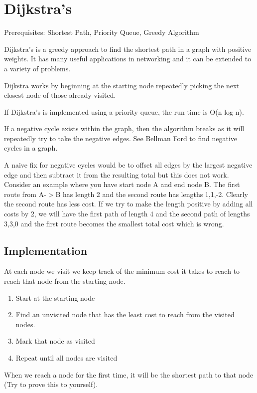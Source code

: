 \documentclass[11pt,oneside]{book}
\begin{document}
        \section{ Dijkstra's }
        

Prerequisites:  Shortest Path, Priority Queue, Greedy Algorithm

Dijkstra's is a greedy approach to find the shortest path in a graph with positive weights. It has many useful applications in networking and it can be extended to a variety of problems.

Dijkstra works by beginning at the starting node repeatedly picking the next closest node of those already visited.

If Dijkstra's is implemented using a priority queue, the run time is O(n log n).

If a negative cycle exists within the graph, then the algorithm breaks as it will repeatedly try to take the negative edges. See Bellman Ford to find negative cycles in a graph.

A naive fix for negative cycles would be to offset all edges by the largest negative edge and then subtract it from the resulting total but this does not work. Consider an example where you have start node A and end node B. The first route from A-$>$B has length 2 and the second route has lengths 1,1,-2. Clearly the second route has less cost. If we try to make the length positive by adding all costs by 2, we will have the first path of length 4 and the second path of lengths 3,3,0 and the first route becomes the smallest total cost which is wrong.

\subsection{Implementation}

At each node we visit we keep track of the minimum cost it takes to reach to reach that node from the starting node.

\begin{enumerate}
\item Start at the starting node
\item Find an unvisited node that has the least cost to reach from the visited nodes.
\item Mark that node as visited
\item Repeat until all nodes are visited
\end{enumerate}

When we reach a node for the first time, it will be the shortest path to that node (Try to prove this to yourself).
\end{document}
